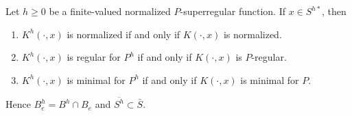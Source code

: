 Let $h \geq 0$ be a finite-valued normalized $P$-superregular function. If $x \in S^{h*}$, then
\begin{enumerate}
\item $K^h(\cdot, x)$ is normalized if and only if $K(\cdot, x)$ is normalized.
\item $K^h(\cdot, x)$ is regular for $P^h$ if and only if $K(\cdot, x)$ is $P$-regular.
\item $K^h(\cdot, x)$ is minimal for $P^h$ if and only if $K(\cdot, x)$ is minimal for $P$.
\end{enumerate}
Hence $B_e^h = B^h \cap B_e$ and $\overline{S^h} \subset \bar{S}$.

